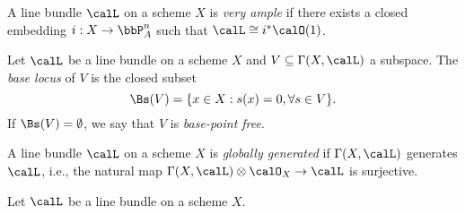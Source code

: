     \begin{definition}\label{def:very_ample_line_bundle}
        A line bundle \(\calL\) on a scheme \(X\) is \emph{very ample} if there exists a closed embedding \(i:X\to \bbP^n_A\) such that \(\calL\cong i^*\calO(1)\).
    \end{definition}

    \begin{definition}\label{def:base_locus}
        Let \(\calL\) be a line bundle on a scheme \(X\) and \(V\subseteq \Gamma(X,\calL)\) a subspace.
        The \emph{base locus} of \(V\) is the closed subset
        \[
            \Bs(V) = \{x\in X : s(x)=0, \forall s\in V\}.
        \]
        If \(\Bs(V)=\emptyset\), we say that \(V\) is \emph{base-point free}.
    \end{definition}

    \begin{definition}\label{def:globally_generated_line_bundle}
        A line bundle \(\calL\) on a scheme \(X\) is \emph{globally generated} if \(\Gamma(X,\calL)\) generates \(\calL\), i.e., the natural map \(\Gamma(X,\calL)\otimes \calO_X \to \calL\) is surjective.
    \end{definition}

    \begin{definition}\label{def:base_locus_and_base_idea}
        Let \(\calL\) be a line bundle on a scheme \(X\).
    \end{definition}


